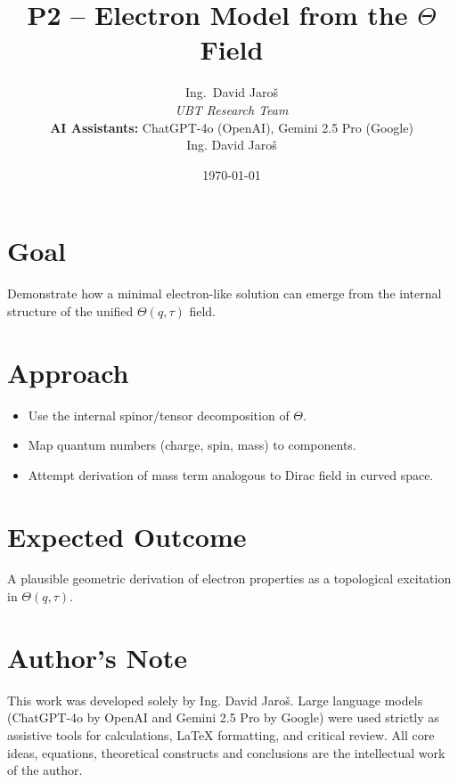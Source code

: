 \documentclass[12pt]{article}
\title{P2 – Electron Model from the $\Theta$ Field}
\author{
Ing.~David Jaroš \\
\textit{UBT Research Team} \\
\textbf{AI Assistants:} ChatGPT-4o (OpenAI), Gemini 2.5 Pro (Google) \\
Ing. David Jaroš}
\date{\today}
\begin{document}
\maketitle

\section*{Goal}
Demonstrate how a minimal electron-like solution can emerge from the internal structure of the unified $\Theta(q,\tau)$ field.

\section*{Approach}
\begin{itemize}
\item Use the internal spinor/tensor decomposition of $\Theta$.
\item Map quantum numbers (charge, spin, mass) to components.
\item Attempt derivation of mass term analogous to Dirac field in curved space.
\end{itemize}

\section*{Expected Outcome}
A plausible geometric derivation of electron properties as a topological excitation in $\Theta(q, \tau)$.


\section*{Author's Note}

This work was developed solely by Ing. David Jaroš.  
Large language models (ChatGPT-4o by OpenAI and Gemini 2.5 Pro by Google) were used strictly as assistive tools for calculations, LaTeX formatting, and critical review.  
All core ideas, equations, theoretical constructs and conclusions are the intellectual work of the author.
\end{document}
